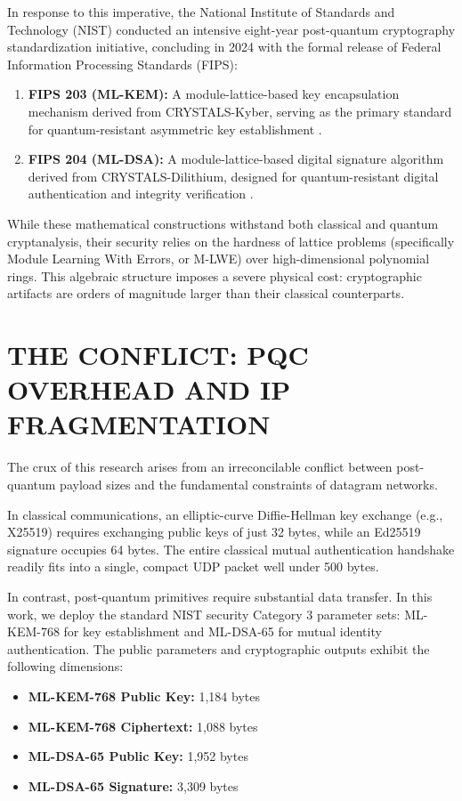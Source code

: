 In response to this imperative, the National Institute of Standards and Technology (NIST) conducted an intensive eight-year post-quantum cryptography standardization initiative, concluding in 2024 with the formal release of Federal Information Processing Standards (FIPS):
\begin{enumerate}
    \item \textbf{FIPS 203 (ML-KEM):} A module-lattice-based key encapsulation mechanism derived from CRYSTALS-Kyber, serving as the primary standard for quantum-resistant asymmetric key establishment \cite{nist_fips203}.
    \item \textbf{FIPS 204 (ML-DSA):} A module-lattice-based digital signature algorithm derived from CRYSTALS-Dilithium, designed for quantum-resistant digital authentication and integrity verification \cite{nist_fips204}.
\end{enumerate}

While these mathematical constructions withstand both classical and quantum cryptanalysis, their security relies on the hardness of lattice problems (specifically Module Learning With Errors, or M-LWE) over high-dimensional polynomial rings. This algebraic structure imposes a severe physical cost: cryptographic artifacts are orders of magnitude larger than their classical counterparts.

\section{THE CONFLICT: PQC OVERHEAD AND IP FRAGMENTATION}
The crux of this research arises from an irreconcilable conflict between post-quantum payload sizes and the fundamental constraints of datagram networks.

In classical communications, an elliptic-curve Diffie-Hellman key exchange (e.g., X25519) requires exchanging public keys of just 32 bytes, while an Ed25519 signature occupies 64 bytes. The entire classical mutual authentication handshake readily fits into a single, compact UDP packet well under 500 bytes.

In contrast, post-quantum primitives require substantial data transfer. In this work, we deploy the standard NIST security Category 3 parameter sets: ML-KEM-768 for key establishment and ML-DSA-65 for mutual identity authentication. The public parameters and cryptographic outputs exhibit the following dimensions:
\begin{itemize}
    \item \textbf{ML-KEM-768 Public Key:} 1,184 bytes
    \item \textbf{ML-KEM-768 Ciphertext:} 1,088 bytes
    \item \textbf{ML-DSA-65 Public Key:} 1,952 bytes
    \item \textbf{ML-DSA-65 Signature:} 3,309 bytes
\end{itemize}

